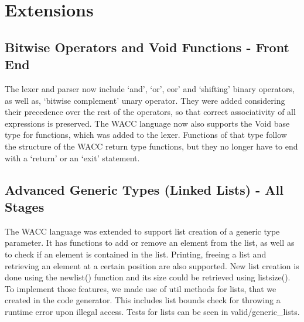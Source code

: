 \documentclass[5pt]{article}
\begin{document}
\section{Extensions}
\subsection{Bitwise Operators and Void Functions - Front End}
The lexer and parser now include ‘and’, ‘or’, eor’ and ‘shifting’ binary operators, as well as, ‘bitwise complement’ unary operator. They were added considering their precedence over the rest of the operators, so that correct associativity of all expressions is preserved. The WACC language now also supports the Void base type for functions, which was added to the lexer. Functions of that type follow the structure of the WACC return type functions, but they no longer have to end with a ‘return’ or an ‘exit’ statement.
\subsection{Advanced Generic Types (Linked Lists) - All Stages}
The WACC language was extended to support list creation of a generic type parameter. It has functions to add or remove an element from the list, as well as to check if an element is contained in the list. Printing, freeing a list and retrieving an element at a certain position are also supported. New list creation is done using the newlist() function and its size could be retrieved using listsize(). To implement those features, we made use of util methods for lists, that we created in the code generator. This includes list bounds check for throwing a runtime error upon illegal access. Tests for lists can be seen in valid/generic\_lists.
\end{document}

